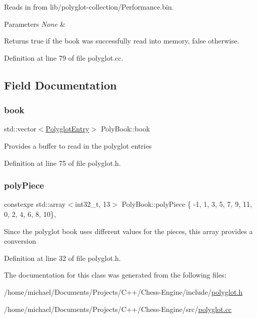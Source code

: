 Reads in from lib/polyglot-\/collection/\+Performance.\+bin. 


\begin{DoxyParams}{Parameters}
{\em None} & \\
\hline
\end{DoxyParams}
\begin{DoxyReturn}{Returns}
true if the book was successfully read into memory, false otherwise. 
\end{DoxyReturn}


Definition at line 79 of file polyglot.\+cc.



\subsection{Field Documentation}
\mbox{\label{classPolyBook_af0e0977de41238bf9b36758ce6b898c1}} 
\subsubsection{\texorpdfstring{book}{book}}
{\footnotesize\ttfamily std\+::vector$<$\mbox{\hyperlink{structPolyglotEntry}{Polyglot\+Entry}}$>$ Poly\+Book\+::book\hspace{0.3cm}{\ttfamily [private]}}

Provides a buffer to read in the polyglot entries 

Definition at line 75 of file polyglot.\+h.

\mbox{\label{classPolyBook_a904f2b4eae9f4a94a11429d47906acd6}} 
\subsubsection{\texorpdfstring{poly\+Piece}{polyPiece}}
{\footnotesize\ttfamily constexpr std\+::array$<$int32\+\_\+t, 13$>$ Poly\+Book\+::poly\+Piece \{ -\/1, 1, 3, 5, 7, 9, 11, 0, 2, 4, 6, 8, 10\}\hspace{0.3cm}{\ttfamily [static]}, {\ttfamily [private]}}

Since the polyglot book uses different values for the pieces, this array provides a conversion 

Definition at line 32 of file polyglot.\+h.



The documentation for this class was generated from the following files\+:\begin{DoxyCompactItemize}
\item 
/home/michael/\+Documents/\+Projects/\+C++/\+Chess-\/\+Engine/include/\mbox{\hyperlink{polyglot_8h}{polyglot.\+h}}\item 
/home/michael/\+Documents/\+Projects/\+C++/\+Chess-\/\+Engine/src/\mbox{\hyperlink{polyglot_8cc}{polyglot.\+cc}}\end{DoxyCompactItemize}
